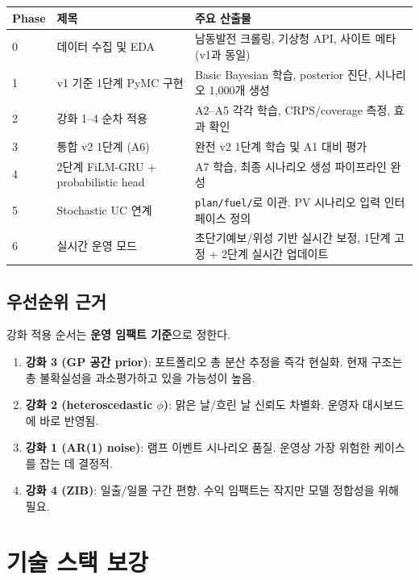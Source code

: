 \documentclass[11pt,a4paper]{article}
\begin{document}
\begin{longtable}{p{1.2cm}p{5cm}p{8cm}}
\toprule
Phase & 제목 & 주요 산출물 \\
\midrule
\endhead
0 & 데이터 수집 및 EDA & 남동발전 크롤링, 기상청 API, 사이트 메타 (v1과 동일) \\
1 & v1 기준 1단계 PyMC 구현 & Basic Bayesian 학습, posterior 진단, 시나리오 1,000개 생성 \\
2 & 강화 1--4 순차 적용 & A2--A5 각각 학습, CRPS/coverage 측정, 효과 확인 \\
3 & 통합 v2 1단계 (A6) & 완전 v2 1단계 학습 및 A1 대비 평가 \\
4 & 2단계 FiLM-GRU + probabilistic head & A7 학습, 최종 시나리오 생성 파이프라인 완성 \\
5 & Stochastic UC 연계 & \texttt{plan/fuel/}로 이관. PV 시나리오 입력 인터페이스 정의 \\
6 & 실시간 운영 모드 & 초단기예보/위성 기반 실시간 보정, 1단계 고정 + 2단계 실시간 업데이트 \\
\bottomrule
\end{longtable}

\subsection{우선순위 근거}

강화 적용 순서는 \textbf{운영 임팩트 기준}으로 정한다.

\begin{enumerate}[leftmargin=2em]
    \item \textbf{강화 3 (GP 공간 prior)}: 포트폴리오 총 분산 추정을 즉각 현실화. 현재 구조는 총 불확실성을 과소평가하고 있을 가능성이 높음.
    \item \textbf{강화 2 (heteroscedastic $\phi$)}: 맑은 날/흐린 날 신뢰도 차별화. 운영자 대시보드에 바로 반영됨.
    \item \textbf{강화 1 (AR(1) noise)}: 램프 이벤트 시나리오 품질. 운영상 가장 위험한 케이스를 잡는 데 결정적.
    \item \textbf{강화 4 (ZIB)}: 일출/일몰 구간 편향. 수익 임팩트는 작지만 모델 정합성을 위해 필요.
\end{enumerate}

\section{기술 스택 보강}
\end{document}
